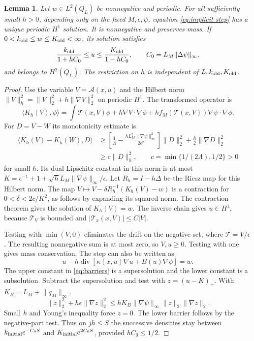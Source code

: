 \documentclass[11pt]{article}
\numberwithin{equation}{section}
\newtheorem{lemma}[theorem]{Lemma}
\theoremstyle{definition}
\theoremstyle{remark}
\newcommand{\Div}{\operatorname{div}}
\newcommand{\norm}[1]{\lVert #1\rVert}
\begin{document}
\begin{lemma}\label{lem:implicit-existence}
Let $w\in L^2(Q_L)$ be nonnegative and periodic.
For all sufficiently small $h>0$, depending only on the fixed
$M,\epsilon,\psi$, equation \eqref{eq:implicit-step} has a unique
periodic $H^1$ solution. It is nonnegative and preserves mass.
If $0<k_{\rm old}\le w\le K_{\rm old}<\infty$, its solution satisfies
\begin{equation}\label{eq:barriers}
 \frac{k_{\rm old}}{1+hC_0}\le u\le
       \frac{K_{\rm old}}{1-hC_0},\qquad
 C_0=L_M\norm{\Delta\psi}_\infty,
\end{equation}
and belongs to $H^2(Q_L)$. The restriction on $h$ is independent of
$L,k_{\rm old},K_{\rm old}$.
\end{lemma}

\begin{proof}
Use the variable $V=\mathcal A(x,u)$ and the Hilbert norm
$\norm V_h^2=\norm V_2^2+h\norm{\nabla V}_2^2$ on periodic $H^1$.
The transformed operator is
\[
 \langle K_h(V),\phi\rangle
   =\int\mathcal T(x,V)\phi+h\nabla V\cdot\nabla\phi
                     +h f_M(\mathcal T(x,V))\nabla\psi\cdot\nabla\phi.
\]
For $D=V-W$ its monotonicity estimate is
\begin{align*}
 \langle K_h(V)-K_h(W),D\rangle
 &\ge\left[\frac1\Lambda
       -\frac{hL_M^2\norm{\nabla\psi}_\infty^2}{2\epsilon^2}\right]
                   \norm D_2^2+\frac h2\norm{\nabla D}_2^2\\
 &\ge c\norm D_h^2,\qquad
 c=\min\{1/(2\Lambda),1/2\}>0
\end{align*}
for small $h$. Its dual Lipschitz constant in this norm is at most
$K=\epsilon^{-1}+1+\sqrt h L_M\norm{\nabla\psi}_\infty/\epsilon$.
Let $R_h=I-h\Delta$ be the Riesz map for this Hilbert norm.
The map
$V\mapsto V-\delta R_h^{-1}(K_h(V)-w)$ is a contraction for
$0<\delta<2c/K^2$, as follows by expanding its squared norm.
The contraction theorem gives the solution of $K_h(V)=w$.
The inverse chain gives $u\in H^1$, because $\mathcal T_V$ is bounded and
$|\mathcal T_x(x,V)|\le C|V|$.

Testing with $\min(V,0)$ eliminates the drift on the negative set,
where $\mathcal T=V/\epsilon$. The resulting nonnegative sum is at most
zero, so $V,u\ge0$. Testing with one gives mass conservation.
The step can also be written as
\[
 u-h\Div[\kappa(x,u)\nabla u+B(u)\nabla\psi]=w.
\]
The upper constant in \eqref{eq:barriers} is a supersolution and the lower
constant is a subsolution. Subtract the supersolution and test with
$z=(u-K)_+$. With $K_B=L_M+\norm{q_M}_\infty$,
\[
 \norm z_2^2+h\epsilon\norm{\nabla z}_2^2
       \le hK_B\norm{\nabla\psi}_\infty\norm z_2\norm{\nabla z}_2.
\]
Small $h$ and Young's inequality force $z=0$. The lower barrier follows
by the negative-part test. Thus on $jh\le S$ the successive densities
stay between $k_{\rm initial}e^{-C_0S}$ and
$K_{\rm initial}e^{2C_0S}$, provided $hC_0\le1/2$.


\end{proof}
\end{document}
